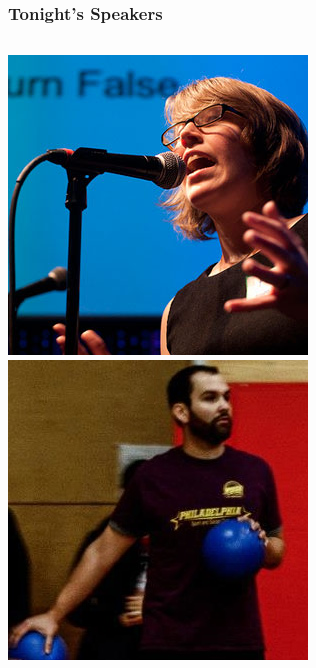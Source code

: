 \documentclass[xcolor=dvipsnames,red]{beamer}
\begin{document}
\begin{frame}
\frametitle{Tonight's Speakers}

\begin{columns}
\begin{column}{.25\textwidth}
\includegraphics[width=.75\textwidth]{imgs/pam_selle.jpg}\\
\vspace{.2 cm}
\includegraphics[width=.75\textwidth]{imgs/hcastro.jpg}\\
\vspace{.2 cm}

\end{column}
\end{columns}
\end{frame}
\end{document}
